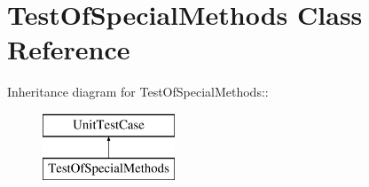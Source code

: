 \hypertarget{class_test_of_special_methods}{
\section{TestOfSpecialMethods Class Reference}
\label{class_test_of_special_methods}
}
Inheritance diagram for TestOfSpecialMethods::\begin{figure}[H]
\begin{center}
\leavevmode
\includegraphics[height=2cm]{class_test_of_special_methods}
\end{center}
\end{figure}
